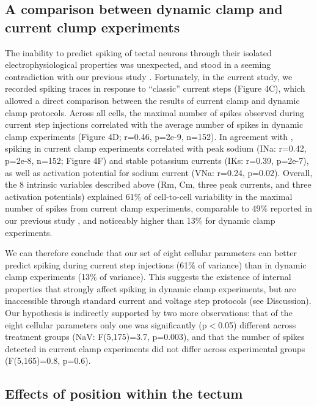\documentclass{article}
\begin{document}
\subsection*{A comparison between dynamic clamp and current clump experiments}

The inability to predict spiking of tectal neurons through their isolated electrophysiological properties was unexpected, and stood in a seeming contradiction with our previous study \citep{ciarleglio2015}. Fortunately, in the current study, we recorded spiking traces in response to “classic” current steps (Figure 4C), which allowed a direct comparison between the results of current clamp and dynamic clamp protocols. Across all cells, the maximal number of spikes observed during current step injections correlated with the average number of spikes in dynamic clamp experiments (Figure 4D; r=0.46, p=2e-9, n=152). In agreement with \citep{ciarleglio2015}, spiking in current clamp experiments correlated with peak sodium (INa: r=0.42, p=2e-8, n=152; Figure 4F) and stable potassium currents (IKs: r=0.39, p=2e-7), as well as activation potential for sodium current (VNa: r=0.24, p=0.02). Overall, the 8 intrinsic variables described above (Rm, Cm, three peak currents, and three activation potentials) explained 61\% of cell-to-cell variability in the maximal number of spikes from current clamp experiments, comparable to 49\% reported in our previous study \citep{ciarleglio2015}, and noticeably higher than 13\% for dynamic clamp experiments.

We can therefore conclude that our set of eight cellular parameters can better predict spiking during current step injections (61\% of variance) than in dynamic clamp experiments (13\% of variance). This suggests the existence of internal properties that strongly affect spiking in dynamic clamp experiments, but are inaccessible through standard current and voltage step protocols (see Discussion). Our hypothesis is indirectly supported by two more observations: that of the eight cellular parameters only one was significantly (p$<$0.05) different across treatment groups (NaV: F(5,175)=3.7, p=0.003), and that the number of spikes detected in current clamp experiments did not differ across experimental groups (F(5,165)=0.8, p=0.6). 

\subsection*{Effects of position within the tectum}
\end{document}
